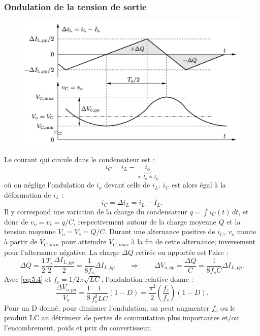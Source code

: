 		\subsubsection{Ondulation de la tension de sortie}
			\begin{figure}
			\vspace{-5mm}
			\includegraphics[scale=0.3]{ch5/5}
			\end{figure}	
			Le courant qui circule dans le condensateur est : 
			\begin{equation}
				i_C = i_L - \underbrace{i_o}_{\approx I_o = I_L}
			\end{equation}
			où on néglige l'ondulation de $i_o$ devant celle de $i_L$. $i_C$ est alors égal à la déformation de $i_L$ :
			\begin{equation}
				i_C = \Delta i_L = i_L -I_L.
			\end{equation}
			Il y correspond une variation de la charge du condensateur $q = \int i_C(t) \, dt$, et donc de $v_o = v_c = q/C$, respectivement autour de la charge moyenne $Q$ et la tension moyenne $V_o = V_c = Q/C$. Durant une alternance positive de $i_C$, $v_o$ monte à partir de $V_{C,min}$ pour atteindre $V_{C,max}$ à la fin de cette alternance; inversement pour l'alternance négative. La charge $\Delta Q$ retirée ou apportée est l'aire : 
			\begin{equation}
				\Delta Q = \frac{1}{2}\frac{T_s}{2}\frac{\Delta I_{L,pp}}{2} = \frac{1}{8f_s}\Delta I_{L,pp} \qquad \Rightarrow \qquad \Delta V_{o,pp} = \frac{\Delta Q}{C} = \frac{1}{8f_sC}\Delta I_{L,pp}.
			\end{equation}
			Avec \eqref{eq:5.4} et $f_c = 1/2\pi \sqrt{LC}$, l'ondulation relative donne : 
			\begin{equation}
				\frac{\Delta V_{o,pp}}{V_o} = \frac{1}{8}\frac{1}{f_s^2LC}(1-D) = \frac{\pi ^2}{2}\left(\frac{f_c}{f_s} \right)(1-D). 
			\end{equation}
			Pour un D donné, pour diminuer l'ondulation, on peut augmenter $f_s$ ou le produit LC au détriment de pertes de commutation plus importantes et/ou l'encombrement, poids et prix du convertisseur. 
			
